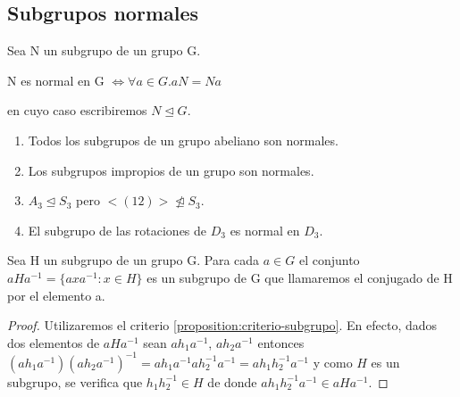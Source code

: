 \subsection{Subgrupos normales}

\begin{definition}
Sea N un subgrupo de un grupo G. 

N es normal en G $\iff \forall a \in G. aN = Na$ 

en cuyo caso escribiremos $N \unlhd G$.
\end{definition}

\begin{example}
\begin{enumerate}
\item Todos los subgrupos de un grupo abeliano son normales.
\item Los subgrupos impropios de un grupo son normales.
\item $A_3 \trianglelefteq S_3$ pero $<(12)> \ntrianglelefteq S_3$.
\item El subgrupo de las rotaciones de $D_3$ es normal en $D_3$.
\end{enumerate}
\end{example}

\begin{lemma}
Sea H un subgrupo de un grupo G. Para cada $a \in G$ el conjunto $aHa^{-1} = \{axa^{-1}:x \in H\}$ es un subgrupo de G que llamaremos el conjugado de H por el elemento a. 
\end{lemma}
\begin{proof}
Utilizaremos el criterio \ref{proposition:criterio-subgrupo}. En efecto, dados dos elementos de $aHa^{-1}$ sean $ah_1a^{-1}$, $ah_2a^{-1}$ entonces $(ah_1a^{-1})(ah_2a^{-1})^{-1} = ah_1a^{-1}ah_2^{-1}a^{-1} = ah_1h_2^{-1}a^{-1}$ y como $H$ es un subgrupo, se verifica que $h_1h_2^{-1} \in H$ de donde $ah_1h_2^{-1}a^{-1} \in aHa^{-1}$.
\end{proof}

